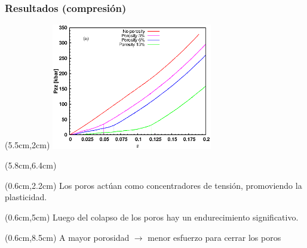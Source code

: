\begin{frame}
    \frametitle{Resultados (compresi\'on)}
    \begin{textblock*}{7cm}(5.5cm,2cm) %
        \includegraphics[width=7cm]{Presentacion_PANACM_Franco/Pzz_strain_comp_dash.eps}
    \end{textblock*}
    \begin{textblock*}{4.2cm}(5.8cm,6.4cm) %
    \end{textblock*}
    \begin{textblock*}{5cm}(0.6cm,2.2cm) %
        Los poros act\'uan como concentradores de tensi\'on, promoviendo la plasticidad. %
    \end{textblock*}
    \begin{textblock*}{4.5cm}(0.6cm,5cm) %
        Luego del colapso de los poros hay un endurecimiento significativo. %
    \end{textblock*}
    \begin{textblock*}{12cm}(0.6cm,8.5cm) %
        A mayor porosidad $\rightarrow$ menor esfuerzo para cerrar los poros
    \end{textblock*}
\end{frame}

